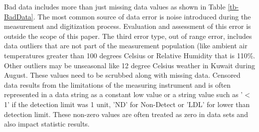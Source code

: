 \documentclass[preprint,12pt,authoryear]{elsarticle}
\begin{document}
\begin{linenumbers}
\begin{table}[H]
\centering
\caption{Common sources of environmental time series data errors}
\label{tb-ErrorSources}
\end{table}


Bad data includes more than just missing data values as shown in Table \ref{tb-BadData}. The most common source of data error is noise introduced during the measurement and digitization process. Evaluation and assessment of this error is outside the scope of this paper. The third error type, out of range error, includes data outliers that are not part of the measurement population (like ambient air temperatures greater than 100 degrees Celsius or Relative Humidity that is 110\%. Other outliers may be unseasonal like 12 degree Celsius weather in Kuwait during August. These values need to be scrubbed along with missing data. Censored data results from the limitations of the measuring instrument and is often represented in a data string as a constant low value or a string value such as '$<$1' if the detection limit was 1 unit, 'ND' for Non-Detect or 'LDL' for lower than detection limit. These non-zero values are often treated as zero in data sets and also impact statistic results. 

\begin{table}[H]
\centering
\caption{Types of error in data sets}
\label{tb-BadData}
\end{table}


\end{linenumbers}
\end{document}
